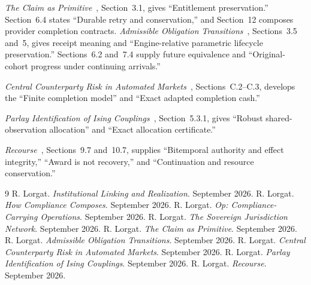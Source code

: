 \documentclass{momentum}
\begin{document}
\emph{The Claim as Primitive}~\cite{claim}, Section~3.1, gives ``Entitlement preservation.''
Section~6.4 states ``Durable retry and conservation,'' and Section~12 composes provider completion contracts.
\emph{Admissible Obligation Transitions}~\cite{transitions}, Sections~3.5 and~5, gives receipt meaning and ``Engine-relative parametric lifecycle preservation.''
Sections~6.2 and~7.4 supply future equivalence and ``Original-cohort progress under continuing arrivals.''

\emph{Central Counterparty Risk in Automated Markets}~\cite{risk}, Sections~C.2--C.3, develops the ``Finite completion model'' and ``Exact adapted completion cash.''

\emph{Parlay Identification of Ising Couplings}~\cite{parlay}, Section~5.3.1, gives ``Robust shared-observation allocation'' and ``Exact allocation certificate.''

\emph{Recourse}~\cite{recourse}, Sections~9.7 and~10.7, supplies ``Bitemporal authority and effect integrity,'' ``Award is not recovery,'' and ``Continuation and resource conservation.''

\begin{thebibliography}{9}
 R. Lorgat. \emph{Institutional Linking and Realization}. September 2026.
 R. Lorgat. \emph{How Compliance Composes}. September 2026.
 R. Lorgat. \emph{Op: Compliance-Carrying Operations}. September 2026.
 R. Lorgat. \emph{The Sovereign Jurisdiction Network}. September 2026.
 R. Lorgat. \emph{The Claim as Primitive}. September 2026.
 R. Lorgat. \emph{Admissible Obligation Transitions}. September 2026.
 R. Lorgat. \emph{Central Counterparty Risk in Automated Markets}. September 2026.
 R. Lorgat. \emph{Parlay Identification of Ising Couplings}. September 2026.
 R. Lorgat. \emph{Recourse}. September 2026.
\end{thebibliography}
\end{document}

